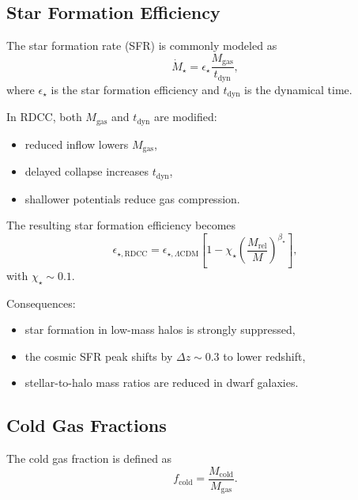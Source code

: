 \documentclass[11pt,a4paper]{article}
\begin{document}
\subsection{Star Formation Efficiency}

The star formation rate (SFR) is commonly modeled as
\begin{equation}
\dot{M}_{\star}
=
\epsilon_{\star}
\frac{M_{\mathrm{gas}}}{t_{\mathrm{dyn}}},
\end{equation}
where $\epsilon_{\star}$ is the star formation efficiency and $t_{\mathrm{dyn}}$ is the dynamical time.

In RDCC, both $M_{\mathrm{gas}}$ and $t_{\mathrm{dyn}}$ are modified:
\begin{itemize}
\item reduced inflow lowers $M_{\mathrm{gas}}$,
\item delayed collapse increases $t_{\mathrm{dyn}}$,
\item shallower potentials reduce gas compression.
\end{itemize}

The resulting star formation efficiency becomes
\begin{equation}
\epsilon_{\star,\mathrm{RDCC}}
=
\epsilon_{\star,\Lambda\mathrm{CDM}}
\left[
1
-
\chi_{\star}
\left(
\frac{M_{\mathrm{rel}}}{M}
\right)^{\beta_{\star}}
\right],
\end{equation}
with $\chi_{\star} \sim 0.1$.

Consequences:
\begin{itemize}
\item star formation in low-mass halos is strongly suppressed,
\item the cosmic SFR peak shifts by $\Delta z \sim 0.3$ to lower redshift,
\item stellar-to-halo mass ratios are reduced in dwarf galaxies.
\end{itemize}

\subsection{Cold Gas Fractions}

The cold gas fraction is defined as
\begin{equation}
f_{\mathrm{cold}}
=
\frac{M_{\mathrm{cold}}}{M_{\mathrm{gas}}}.
\end{equation}
\end{document}
